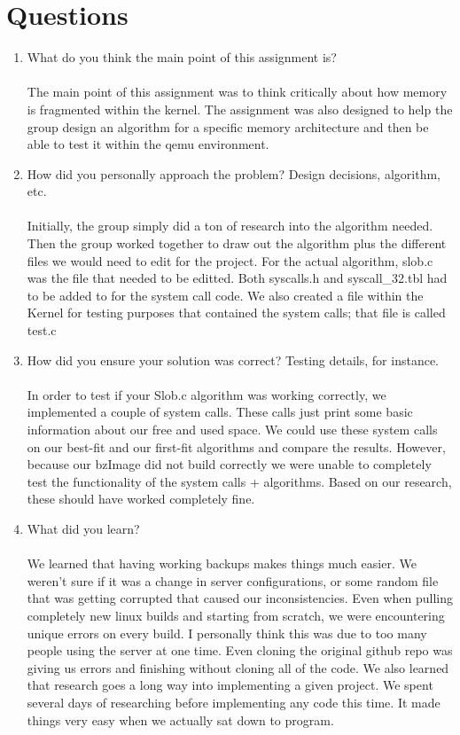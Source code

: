 \documentclass[10pt,drafclsnofoot,onecolumn]{IEEEtran}
\begin{document}
\section{Questions}
\begin{enumerate}
\item{What do you think the main point of this assignment is?}
\\ \\ The main point of this assignment was to think critically about how memory is fragmented within the kernel. The assignment was also designed to help the group design an algorithm for a specific memory architecture and then be able to test it within the qemu environment. \\


\item{How did you personally approach the problem? Design decisions, algorithm, etc.}
\\	\\Initially, the group simply did a ton of research into the algorithm needed. Then the group worked together to draw out the algorithm plus the different files we would need to edit for the project. For the actual algorithm, slob.c was the file that needed to be editted. Both syscalls.h and syscall\_32.tbl had to be added to for the system call code. We also created a file within the Kernel for testing purposes that contained the system calls; that file is called test.c \\


\item{How did you ensure your solution was correct? Testing details, for instance.}
\\ \\ In order to test if your Slob.c algorithm was working correctly, we implemented a couple of system calls. These calls just print some basic information about our free and used space.  We could use these system calls on our best-fit and our first-fit algorithms and compare the results. However, because our bzImage did not build correctly we were unable to completely test the functionality of the system calls + algorithms. Based on our research, these should have worked completely fine.  
\\
\item{What did you learn?}
\\ \\ We learned that having working backups makes things much easier. We weren't sure if it was a change in server configurations, or some random file that was getting corrupted that caused our inconsistencies. Even when pulling completely new linux builds and starting from scratch, we were encountering unique errors on every build. I personally think this was due to too many people using the server at one time. Even cloning the original github repo was giving us errors and finishing without cloning all of the code. We also learned that research goes a long way into implementing a given project. We spent several days of researching before implementing any code this time. It made things very easy when we actually sat down to program. 
\\


\end{enumerate}
\end{document}
